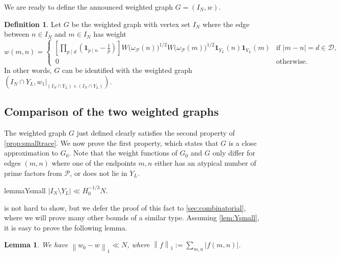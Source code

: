 \documentclass[11pt]{amsart}
\newtheorem{lemma}[theorem]{Lemma}
\theoremstyle{definition}
\newtheorem{definition}[theorem]{Definition}
\newcommand{\norm}[1]{\left\|#1\right\|}
\newcommand{\abs}[1]{\left|#1\right|}
\newcommand{\ind}[1]{\mathbf{1}_{#1}}
\newcommand{\N}{I_N}
\newcommand{\primes}{\mathcal{P}}
\newcommand{\D}{\mathcal{D}}
\newcommand{\graph}{G}
\newcommand{\elln}{L}
\newcommand{\Y}{Y_{\!\elln}}
\begin{document}
We are ready to define the announced weighted graph $\graph = (\N, w)$.

\begin{definition}
\label{def:Gamma}
Let $\graph$ be the weighted graph with vertex set $\N$ where the edge between $n\in \N$ and $m\in \N$ has weight
\begin{equation*}
w(m,n) =
\begin{cases}
\left[\prod_{p \mid d}\left(\ind{p\mid n}-\frac{1}{p}\right) \right] W\big(\omega_{\primes}(n)\big)^{1/2}W\big(\omega_{\primes}(m)\big)^{1/2}\ind{\Y}(n) \ind{\Y}(m) &\text{if }|m-n| = d\in \D,\\
\, {0} & \text{otherwise.}
\end{cases}
\end{equation*}
In other words, $\graph$ can be identified with the weighted graph $(\N\cap \Y, w_1|_{(\N\cap \Y)\times (\N\cap \Y)})$.
\end{definition}


\subsection{Comparison of the two weighted graphs}
The weighted graph $\graph$ just defined clearly satisfies the second property of \cref{prop:smalltrace}. We now prove the first property, which states that $\graph$ is a close approximation to $\graph_0$. Note that the weight functions of $\graph_0$ and $\graph$ only differ for edges $(m,n)$ where one of the endpoints $m, n$ either has an atypical number of prime factors from $\primes$, or does not lie in $\Y$. 


\begin{restatable}{lemma}{Ysmall}
\label{lem:Ysmall}$\abs{\N \setminus \Y} \ll H_0^{-1/3}N$.
\end{restatable}

 is not hard to show, but we defer the proof of this fact to \cref{sec:combinatorial}, where we will prove many other bounds of a similar type. Assuming \cref{lem:Ysmall}, it is easy to prove the following lemma.

\begin{lemma}
\label{lem:introducingcutoff}
We have $\norm{w_0-w}_1 \ll N$, where $\norm{f}_1 := \sum_{m,n}|f(m,n)|$.
\end{lemma}
\end{document}
